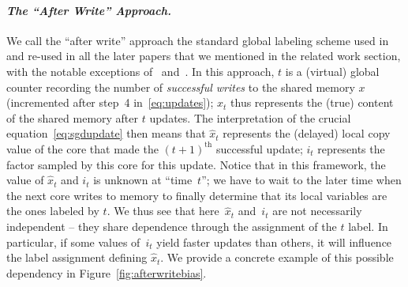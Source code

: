 \documentclass[twoside, 11pt]{article}
\begin{document}
\paragraph{\textit{The ``After Write'' Approach.}} We call the ``after write'' approach the standard global labeling scheme used in~\citet{hogwild} and re-used in all the later papers that we mentioned in the related work section, with the notable exceptions of~\citet{mania} and~\citet{duchi}. In this approach, $t$ is a (virtual) global counter recording the number of \emph{successful writes} to the shared memory $x$ (incremented after step~4 in~\ref{eq:updates}); $x_t$ thus represents the (true) content of the shared memory after $t$ updates.
The interpretation of the crucial equation~\eqref{eq:sgdupdate} then means that $\hat{x}_t$ represents the (delayed) local copy value of the core that made the $(t+1)^{\mathrm{th}}$ successful update; $i_t$ represents the factor sampled by this core for this update.
Notice that in this framework, the value of $\hat x_t$ and $i_t$ is unknown at ``time~$t$''; we have to wait to the later time when the next core writes to memory to finally determine that its local variables are the ones labeled by $t$.
We thus see that here~$\hat x_t$ and~$i_t$ are not necessarily independent -- they share dependence through the assignment of the $t$ label.
In particular, if some values of~$i_t$ yield faster updates than others, it will influence the label assignment defining $\hat x_t$.
We provide a concrete example of this possible dependency in Figure~\ref{fig:afterwritebias}.
\end{document}
